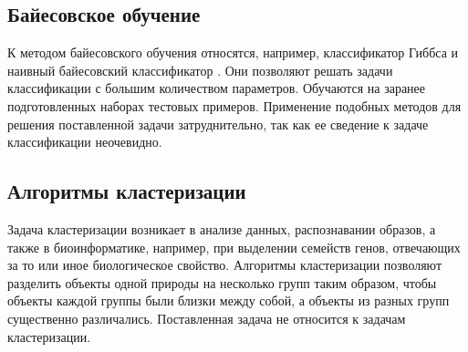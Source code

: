 	\subsection{Байесовское обучение}
	К методом байесовского обучения относятся, например, классификатор Гиббса и наивный байесовский классификатор \cite{mitchell-ml}. Они позволяют решать задачи классификации с большим количеством параметров. Обучаются на заранее подготовленных наборах тестовых примеров. Применение подобных методов для решения поставленной задачи затруднительно, так как ее сведение к задаче классификации неочевидно.
	\subsection{Алгоритмы кластеризации}
	Задача кластеризации \cite{alpaydin} возникает в анализе данных, распознавании образов, а также в биоинформатике, например, при выделении семейств генов, отвечающих за то или иное биологическое свойство. Алгоритмы кластеризации позволяют разделить объекты одной природы на несколько групп таким образом, чтобы объекты каждой группы были близки между собой, а объекты из разных групп существенно различались. Поставленная задача не относится к задачам кластеризации.